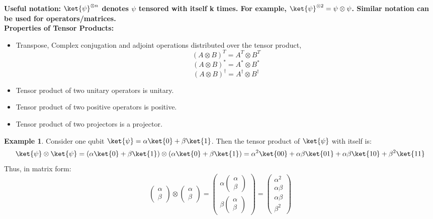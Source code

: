 \documentclass[12pt, oneside]{book}
\theoremstyle{definition}
\theoremstyle{definition}
\newtheorem{example}{Example}[section]
\theoremstyle{remark}
\begin{document}
\textbf{Useful notation: $\ket{\psi}^{\otimes n}$ denotes $\psi$ tensored with itself k times. For example, $\ket{\psi}^{\otimes 2} = \psi \otimes \psi$. Similar notation can be used for operators/matrices.}
\\
\textbf{Properties of Tensor Products: }
\begin{itemize}
    \item Transpose, Complex conjugation and adjoint operations distributed over the tensor product,
    \[ (A \otimes B)^T = A^T \otimes B^T \]
    \[ (A \otimes B)^{*}=A^{*} \otimes B^{*} \]
    \[ (A \otimes B)^{\dagger}=A^{\dagger} \otimes B^{\dagger} \]
    \item Tensor product of two unitary operators is unitary.
    \item Tensor product of two positive operators is positive.
    \item Tensor product of two projectors is a projector.
\end{itemize}
\begin{example}
    Consider one qubit $\ket{\psi}=\alpha \ket{0} + \beta \ket{1}$. Then the tensor product of $\ket{\psi}$ with itself is:
    \[ \ket{\psi} \otimes \ket{\psi} = (\alpha \ket{0} + \beta \ket{1}) \otimes (\alpha \ket{0} + \beta \ket{1}) = \alpha^2 \ket{00} + \alpha \beta \ket{01} + \alpha \beta \ket{10} + \beta^2 \ket{11} \]
    Thus, in matrix form:
    \[ \begin{pmatrix} \alpha \\ \beta \end{pmatrix} \otimes \begin{pmatrix} \alpha \\ \beta \end{pmatrix} = \begin{pmatrix} \alpha \begin{pmatrix} \alpha \\ \beta \end{pmatrix} \\ \beta \begin{pmatrix} \alpha \\ \beta \end{pmatrix} \end{pmatrix} = \begin{pmatrix} \alpha^2 \\ \alpha \beta \\ \alpha \beta \\ \beta^2 \end{pmatrix} \]
\end{example}
\end{document}
